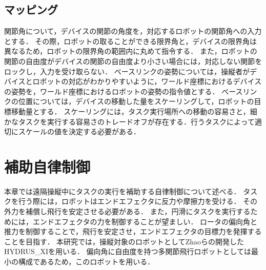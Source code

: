 \documentclass{jarticle}
\begin{document}
\subsection{マッピング}
関節角について，デバイスの関節の角度を，対応するロボットの関節角への入力とする．
その際，ロボットの取ることができる限界角と，デバイスの限界角は異なるため，ロボットの限界角の範囲内に丸めて指令する．
また，ロボットの関節の自由度がデバイスの関節の自由度より小さい場合には，対応しない関節をロックし，入力を受け取らない．
ベースリンクの姿勢については，操縦者がデバイスとロボットの対応がわかりやすいように，ワールド座標におけるデバイスの姿勢を，ワールド座標におけるロボットの姿勢の指令値とする．
ベースリンクの位置については，デバイスの移動した量をスケーリングして，ロボットの目標移動量とする．
スケーリングには，タスク実行場所への移動の容易さと，細かなタスクを実行する容易さのトレードオフが存在する．行うタスクによって適切にスケールの値を決定する必要がある．

\section{補助自律制御}
本章では遠隔操縦中にタスクの実行を補助する自律制御について述べる．
タスクを行う際には，ロボットはエンドエフェクタに反力や摩擦力を受ける．
その外力を補償し飛行を安定させる必要がある．
また，円滑にタスクを実行するためには，エンドエフェクタの力を制御することが望ましい．
ロータの偏向角と推力を制御することで，飛行を安定させ，エンドエフェクタの目標力を発揮することを目指す．
本研究では，操縦対象のロボットとしてZhaoら\cite{hydrus_xi}の開発したHYDRUS\_XIを用いる．
偏向角に自由度を持つ多関節飛行ロボットとしては最小の構成であるため，このロボットを用いる．
\end{document}
